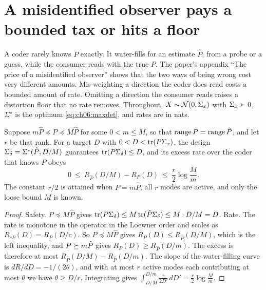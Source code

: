 

\section{A misidentified observer pays a bounded tax or hits a floor}\label{sec:ch06:mismatch}

A coder rarely knows $P$ exactly. It water-fills for an estimate $\hat P$, from a probe or a guess, while the consumer reads with the true $P$. The paper's appendix ``The price of a misidentified observer'' shows that the two ways of being wrong cost very different amounts. Mis-weighting a direction the coder does read costs a bounded amount of rate. Omitting a direction the consumer reads raises a distortion floor that no rate removes. Throughout, $X\sim\mathcal{N}(0,\Sigma_x)$ with $\Sigma_x\succ 0$, $\Sigma^\star$ is the optimum \cref{eq:ch06:maxdet}, and rates are in nats.

\begin{theorem}\label{thm:ch06:commission}
Suppose $m\hat P\preceq P\preceq M\hat P$ for some $0<m\le M$, so that $\operatorname{range} P=\operatorname{range}\hat P$, and let $r$ be that rank. For a target $D$ with $0<D<\operatorname{tr}(P\Sigma_x)$, the design $\Sigma_\delta=\Sigma^\star(\hat P,D/M)$ guarantees $\operatorname{tr}(P\Sigma_\delta)\le D$, and its excess rate over the coder that knows $P$ obeys
\begin{equation}\label{eq:ch06:commission}
0\ \le\ R_{\hat P}(D/M)-R_P(D)\ \le\ \frac r2\log\frac Mm .
\end{equation}
The constant $r/2$ is attained when $P=m\hat P$, all $r$ modes are active, and only the loose bound $M$ is known.
\end{theorem}

\begin{proof}
Safety. $P\preceq M\hat P$ gives $\operatorname{tr}(P\Sigma_\delta)\le M\operatorname{tr}(\hat P\Sigma_\delta)\le M\cdot D/M=D$. Rate. The rate is monotone in the operator in the Loewner order and scales as $R_{cP}(D)=R_P(D/c)$. So $P\preceq M\hat P$ gives $R_P(D)\le R_{\hat P}(D/M)$, which is the left inequality, and $P\succeq m\hat P$ gives $R_P(D)\ge R_{\hat P}(D/m)$. The excess is therefore at most $R_{\hat P}(D/M)-R_{\hat P}(D/m)$. The slope of the water-filling curve is $dR/dD=-1/(2\theta)$, and with at most $r$ active modes each contributing at most $\theta$ we have $\theta\ge D/r$. Integrating gives $\int_{D/M}^{D/m}\frac{r}{2D'}\,dD'=\frac r2\log\frac Mm$.
\end{proof}

